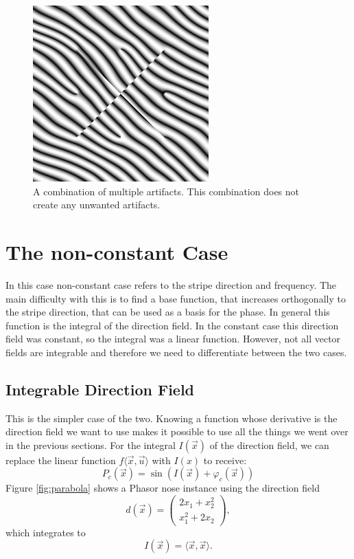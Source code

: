 \documentclass{utue} %
\begin{document}
\begin{figure}[ht]
  \centering
  \includegraphics[width=0.45\linewidth]{images/combiningArtifacts}
  \caption{A combination of multiple artifacts. This combination does not create any unwanted artifacts.}\label{fig:combiningArtifacts}
\end{figure}



\section{The non-constant Case}
In this case non-constant case refers to the stripe direction and frequency. The main difficulty with this is to find a base function, that increases orthogonally to the stripe direction, that can be used as a basis for the phase. In general this function is the integral of the direction field. In the constant case this direction field was constant, so the integral was a linear function. However, not all vector fields are integrable and therefore we need to differentiate between the two cases.

\subsection{Integrable Direction Field}
This is the simpler case of the two. Knowing a function whose derivative is the direction field we want to use makes it possible to use all the things we went over in the previous sections. For the integral $I(\vec{x})$ of the direction field, we can replace the linear function $f\langle\vec{x},\vec{u}\rangle$ with $I(x)$ to receive:
$$
P_c(\vec{x}) = \sin(I(\vec{x})+\varphi_c(\vec{x}))
$$
Figure \ref{fig:parabola} shows a Phasor nose instance using the direction field
$$
d(\vec{x}) = \begin{pmatrix}
2x_1+x_2^2\\
x_1^2+2x_2
\end{pmatrix},
$$
which integrates to
$$
I(\vec{x}) = \langle \vec{x},\vec{x} \rangle.
$$
\end{document}

